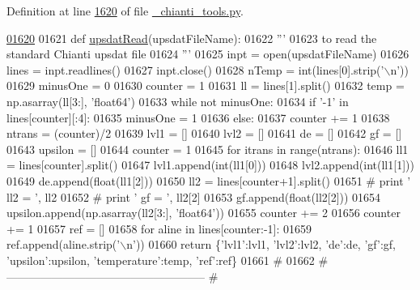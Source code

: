 Definition at line \hyperlink{__chianti__tools_8py_source_l01620}{1620} of file \hyperlink{__chianti__tools_8py_source}{\-\_\-chianti\-\_\-tools.\-py}.


\begin{DoxyCode}
\hypertarget{namespacepyneb_1_1utils_1_1__chianti__tools_l01620}{}\hyperlink{namespacepyneb_1_1utils_1_1__chianti__tools_ae590342dcbbea1f4552a401016c54480}{01620} 
01621 \textcolor{keyword}{def }\hyperlink{namespacepyneb_1_1utils_1_1__chianti__tools_ae590342dcbbea1f4552a401016c54480}{upsdatRead}(upsdatFileName):
01622     \textcolor{stringliteral}{'''}
01623 \textcolor{stringliteral}{    to read the standard Chianti upsdat file}
01624 \textcolor{stringliteral}{    '''}
01625     inpt = open(upsdatFileName)
01626     lines = inpt.readlines()
01627     inpt.close()
01628     nTemp = int(lines[0].strip(\textcolor{stringliteral}{'\(\backslash\)n'}))
01629     minusOne = 0
01630     counter = 1
01631     ll = lines[1].split()
01632     temp = np.asarray(ll[3:], \textcolor{stringliteral}{'float64'})
01633     \textcolor{keywordflow}{while} \textcolor{keywordflow}{not} minusOne:
01634         \textcolor{keywordflow}{if} \textcolor{stringliteral}{'-1'} \textcolor{keywordflow}{in} lines[counter][:4]:
01635             minusOne = 1
01636         \textcolor{keywordflow}{else}:
01637             counter += 1
01638     ntrans = (counter)/2
01639     lvl1 = []
01640     lvl2 = []
01641     de = []
01642     gf = []
01643     upsilon = []
01644     counter = 1
01645     \textcolor{keywordflow}{for} itrans \textcolor{keywordflow}{in} range(ntrans):
01646         ll1 = lines[counter].split()
01647         lvl1.append(int(ll1[0]))
01648         lvl2.append(int(ll1[1]))
01649         de.append(float(ll1[2]))
01650         ll2 = lines[counter+1].split()
01651 \textcolor{comment}{#        print ' ll2 = ', ll2}
01652 \textcolor{comment}{#        print ' gf = ', ll2[2]}
01653         gf.append(float(ll2[2]))
01654         upsilon.append(np.asarray(ll2[3:], \textcolor{stringliteral}{'float64'}))
01655         counter += 2
01656     counter += 1
01657     ref = []
01658     \textcolor{keywordflow}{for} aline \textcolor{keywordflow}{in} lines[counter:-1]:
01659         ref.append(aline.strip(\textcolor{stringliteral}{'\(\backslash\)n'}))
01660     \textcolor{keywordflow}{return} \{\textcolor{stringliteral}{'lvl1'}:lvl1, \textcolor{stringliteral}{'lvl2'}:lvl2, \textcolor{stringliteral}{'de'}:de, \textcolor{stringliteral}{'gf'}:gf, \textcolor{stringliteral}{'upsilon'}:upsilon, \textcolor{stringliteral}{'temperature'}:temp, \textcolor{stringliteral}{'ref'}:ref\}
01661     \textcolor{comment}{#}
01662     \textcolor{comment}{# -----------------------------------------------------}
    \textcolor{comment}{#}
\end{DoxyCode}
